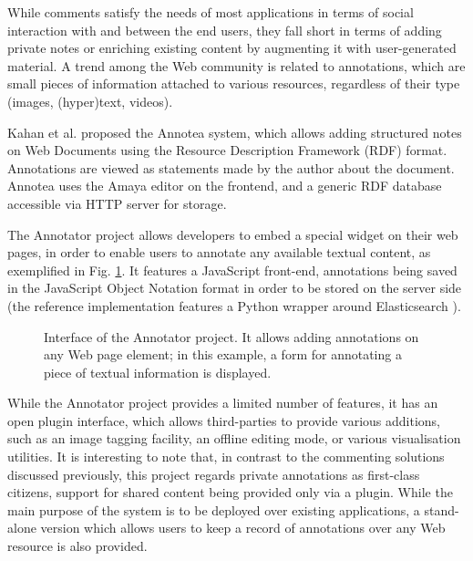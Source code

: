While comments satisfy the needs of most applications in terms of social
interaction with and between the end users, they fall short in terms of adding
private notes or enriching existing content by augmenting it with
user-generated material. A trend among the Web community is related to
annotations, which are small pieces of information attached to various
resources, regardless of their type (images, (hyper)text, videos).

Kahan et al. \cite{ref:annotea} proposed the Annotea system, which allows
adding structured notes on Web Documents using the Resource Description
Framework (RDF) format. Annotations are viewed as statements made by the author
about the document. Annotea uses the Amaya \cite{ref:amaya} editor on the
frontend, and a generic RDF database accessible via HTTP server for storage.

The Annotator project \cite{ref:annotator} allows developers to embed a special
widget on their web pages, in order to enable users to annotate any available
textual content, as exemplified in Fig. \ref{fig:annotator}.  It features a
JavaScript front-end, annotations being saved in the JavaScript Object Notation
format in order to be stored on the server side (the reference implementation
features a Python wrapper around Elasticsearch \cite{ref:elasearch}).

\begin{figure}[!ht]
  \centering
  \caption[Interface of the Annotator project]
          {Interface of the Annotator project. It allows
           adding annotations on any Web page element; in this example, a form
           for annotating a piece of textual information is displayed.}
  \label{fig:annotator}
\end{figure}

While the Annotator project provides a limited number of features, it has an
open plugin interface, which allows third-parties to provide various additions,
such as an image tagging facility, an offline editing mode, or various
visualisation utilities. It is interesting to note that, in contrast to the
commenting solutions discussed previously, this project regards private
annotations as first-class citizens, support for shared content being provided
only via a plugin. While the main purpose of the system is to be deployed over
existing applications, a stand-alone version which allows users to keep a
record of annotations over any Web resource is also provided.

